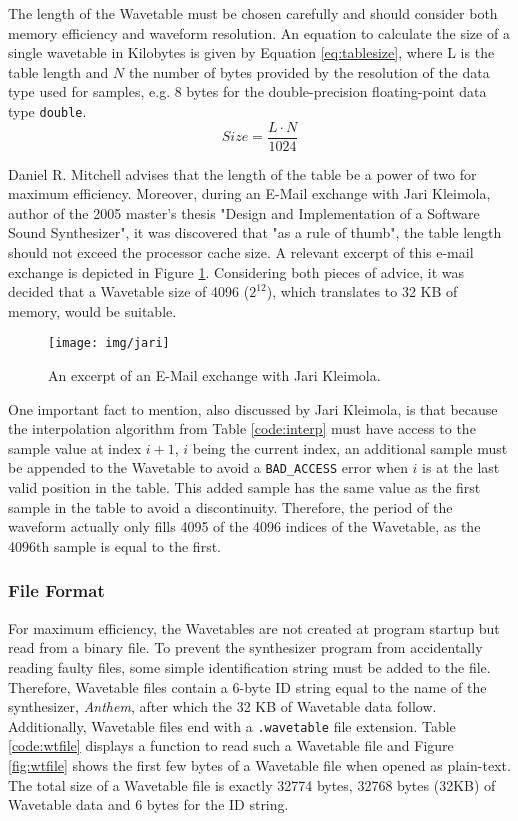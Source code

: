 The length of the Wavetable must be chosen carefully and should consider both memory efficiency and waveform resolution. An equation to calculate the size of a single wavetable in Kilobytes is given by Equation \ref{eq:tablesize}, where L is the table length and $N$ the number of bytes provided by the resolution of the data type used for samples, e.g. 8 bytes for the double-precision floating-point data type \texttt{double}.
\begin{equation}
  Size = \frac{L \cdot N}{1024}
  \label{eq:tablesize}
\end{equation}

Daniel R. Mitchell advises that the length of the table be a power of two for maximum efficiency.  Moreover, during an E-Mail exchange with Jari Kleimola, author of the 2005 master's thesis "Design and Implementation of a Software Sound Synthesizer", it was discovered that "as a rule of thumb", the table length should not exceed the processor cache size. A relevant excerpt of this e-mail exchange is depicted in Figure \ref{fig:jari}. Considering both pieces of advice, it was decided that a Wavetable size of 4096 ($2^{12}$), which translates to 32 KB of memory, would be suitable. \parbreak

\begin{figure}[h!]
  \texttt{[image: img/jari]}
  \caption{An excerpt of an E-Mail exchange with Jari Kleimola.}
  \label{fig:jari}
\end{figure}

\pagebreak

One important fact to mention, also discussed by Jari Kleimola, is that because the interpolation algorithm from Table \ref{code:interp} must have access to the sample value at index $i+1$, $i$ being the current index, an additional sample must be appended to the Wavetable to avoid a \texttt{BAD\_ACCESS} error when $i$ is at the last valid position in the table. This added sample has the same value as the first sample in the table to avoid a discontinuity. Therefore, the period of the waveform actually only fills 4095 of the 4096 indices of the Wavetable, as the 4096th sample is equal to the first.

\subsubsection{File Format}

For maximum efficiency, the Wavetables are not created at program startup but read from a binary file. To prevent the synthesizer program from accidentally reading faulty files, some simple identification string must be added to the file. Therefore, Wavetable files contain a 6-byte ID string equal to the name of the synthesizer, \emph{Anthem}, after which the 32 KB of Wavetable data follow. Additionally, Wavetable files end with a \texttt{.wavetable} file extension. Table \ref{code:wtfile} displays a function to read such a Wavetable file and Figure \ref{fig:wtfile} shows the first few bytes of a Wavetable file when opened as plain-text. The total size of a Wavetable file is exactly 32774 bytes, 32768 bytes (32KB) of Wavetable data and 6 bytes for the ID string.

